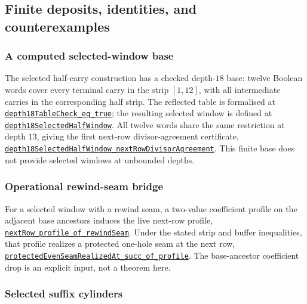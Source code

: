 \documentclass[11pt]{article}
\newcommand{\commit}{81150c1c6fdd4cd51e76d3aa0de344341e0e9e7c}
\newcommand{\repobase}{https://github.com/wcook04/plectis-lean-erdos249-257/blob/\commit}
\newcommand{\PK}{Erdos249257}
\newcommand{\lref}[3]{\href{\repobase/\PK/#1\#L#2}{\nolinkurl{#3}}}
\newcommand{\lrefx}[3]{\href{\repobase/\PK/#1\#L#2}{\nolinkurl{#3}}}
\theoremstyle{definition}
\theoremstyle{remark}
\begin{document}
\subsection{Finite deposits, identities, and counterexamples}

\subsubsection{A computed selected-window base}\label{res:selectedwindowbase}

The selected half-carry construction has a checked depth-$18$ base: twelve
Boolean words cover every terminal carry in the strip $[1,12]$, with all
intermediate carries in the corresponding half strip.  The reflected table is
formalised at
\lref{HalfCarrySelectedWindowBase.lean}{79}{depth18TableCheck_eq_true};
the resulting selected window is defined at
\lrefx{HalfCarrySelectedWindowBase.lean}{129}{depth18SelectedHalfWindow}.
All twelve words share the same restriction at depth $13$, giving the first
next-row divisor-agreement certificate,
\lrefx{HalfCarrySelectedWindowBase.lean}{172}{depth18SelectedHalfWindow_nextRowDivisorAgreement}.
This finite base does not provide selected windows at unbounded depths.

\subsubsection{Operational rewind-seam bridge}\label{res:rewindseambridge}

For a selected window with a rewind seam, a two-value coefficient profile on
the adjacent base ancestors induces the live next-row profile,
\lref{RewindSeamOperationalBridge.lean}{140}{nextRow_profile_of_rewindSeam}.
Under the stated strip and buffer inequalities, that profile realizes a
protected one-hole seam at the next row,
\lrefx{RewindSeamOperationalBridge.lean}{217}{protectedEvenSeamRealizedAt_succ_of_profile}.
The base-ancestor coefficient drop is an explicit input, not a theorem here.

\subsubsection{Selected suffix cylinders}\label{res:selectsuffix}
\end{document}
